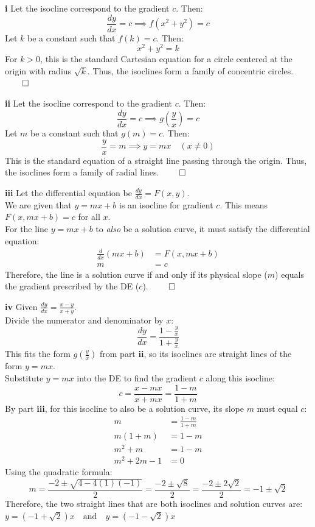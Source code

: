 \begin{solution}
\textbf{i} Let the isocline correspond to the gradient $c$. Then:
\[ \frac{dy}{dx} = c \implies f(x^2 + y^2) = c \]
Let $k$ be a constant such that $f(k) = c$. Then:
\[ x^2 + y^2 = k \]
For $k > 0$, this is the standard Cartesian equation for a circle centered at the origin with radius $\sqrt{k}$. Thus, the isoclines form a family of concentric circles. $\qed$

\vspace{0.3cm}
\textbf{ii} Let the isocline correspond to the gradient $c$. Then:
\[ \frac{dy}{dx} = c \implies g\left(\frac{y}{x}\right) = c \]
Let $m$ be a constant such that $g(m) = c$. Then:
\[ \frac{y}{x} = m \implies y = mx \quad (x \neq 0) \]
This is the standard equation of a straight line passing through the origin. Thus, the isoclines form a family of radial lines. $\qed$

\vspace{0.3cm}
\textbf{iii} Let the differential equation be $\frac{dy}{dx} = F(x,y)$. \\
We are given that $y = mx + b$ is an isocline for gradient $c$. This means $F(x, mx+b) = c$ for all $x$. \\
For the line $y = mx + b$ to \textit{also} be a solution curve, it must satisfy the differential equation:
\begin{align*}
    \frac{d}{dx}(mx + b) &= F(x, mx+b) \\
    m &= c
\end{align*}
Therefore, the line is a solution curve if and only if its physical slope ($m$) equals the gradient prescribed by the DE ($c$). $\qed$

\vspace{0.3cm}
\textbf{iv} Given $\frac{dy}{dx} = \frac{x-y}{x+y}$. \\
Divide the numerator and denominator by $x$:
\[ \frac{dy}{dx} = \frac{1 - \frac{y}{x}}{1 + \frac{y}{x}} \]
This fits the form $g\left(\frac{y}{x}\right)$ from part \textbf{ii}, so its isoclines are straight lines of the form $y = mx$. \\
Substitute $y = mx$ into the DE to find the gradient $c$ along this isocline:
\[ c = \frac{x - mx}{x + mx} = \frac{1 - m}{1 + m} \]
By part \textbf{iii}, for this isocline to also be a solution curve, its slope $m$ must equal $c$:
\begin{align*}
    m &= \frac{1 - m}{1 + m} \\
    m(1 + m) &= 1 - m \\
    m^2 + m &= 1 - m \\
    m^2 + 2m - 1 &= 0
\end{align*}
Using the quadratic formula:
\[ m = \frac{-2 \pm \sqrt{4 - 4(1)(-1)}}{2} = \frac{-2 \pm \sqrt{8}}{2} = \frac{-2 \pm 2\sqrt{2}}{2} = -1 \pm \sqrt{2} \]
Therefore, the two straight lines that are both isoclines and solution curves are: \\
\textbf{$y = (-1 + \sqrt{2})x \quad \text{and} \quad y = (-1 - \sqrt{2})x$}
\end{solution}

